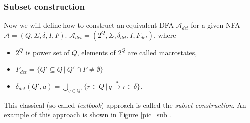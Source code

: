   \subsubsection{Subset construction}
	\label{subset}
	Now we will define how to construct an equivalent DFA $\mathcal{A}_{det}$ for a given NFA $\mathcal{A}=(Q,\Sigma,\delta,I,F)$. 
  \newline
  \newline
	\label{defSubset}
	$\mathcal{A}_{det}=(2^Q,\Sigma,\delta_{det},I,F_{det})$, where
	\begin{itemize}
		\item $2^Q$ is power set of $Q$, elements of $2^Q$ are called macrostates,
		\item $F_{det}=\{Q'\subseteq Q\ |\ Q'\cap F \not = \emptyset\}$
		\item $\delta_{det}(Q',a)=\bigcup\limits_{q\in Q'}\{r\in Q\,|\,q\xrightarrow{a}r \in \delta\}$.
	\end{itemize}

  This classical (so-called \emph{textbook}) approach is called the \emph{subset construction}.
    An example of this approach is shown in Figure \ref{pic_sub}.
	
